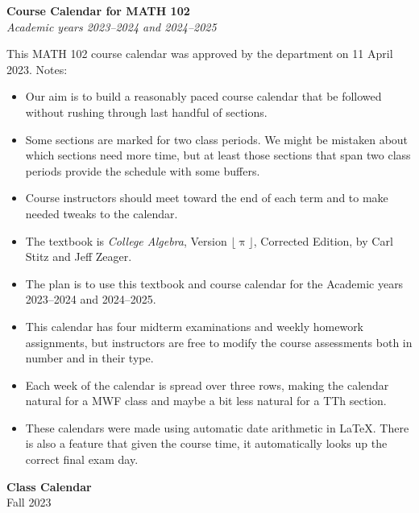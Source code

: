 \documentclass[11pt]{article} %
\newcounter{hw}\setcounter{hw}{0}
\newcounter{ex}\setcounter{ex}{0}
\newcounter{wk}\setcounter{wk}{0}
\newcommand{\calendarHead}[2]{%
  \setcounter{ex}{0}
  \setcounter{hw}{0}
  \setcounter{wk}{0}
  \large
   \begin{flushleft}
    \textbf{Class Calendar} \\
    #1 #2
  \end{flushleft}
  \normalsize}
\begin{document}
\begin{flushleft}
\large
\textbf{Course Calendar for MATH 102} \\
\normalsize
\emph{Academic years 2023--2024 and 2024--2025}
\end{flushleft}

\noindent This MATH 102 course calendar was approved by the department on 11 April 2023. 
Notes:

\begin{itemize}

\item Our aim is to build a reasonably paced course calendar that
be followed without rushing through last handful of
sections. 

\item Some sections are marked for two class periods. We might be
mistaken about which sections need more time, but at least those
sections that span two class periods provide the schedule with
some buffers. 

\item Course instructors should meet toward the end of each term 
and to make needed tweaks to the calendar.

\item The textbook is \emph{College Algebra}, Version $\lfloor \uppi \rfloor$,
Corrected Edition, by Carl Stitz and Jeff Zeager.

\item The plan is to use this textbook and course calendar for the Academic years 2023--2024 and 2024--2025.

\item This calendar has four midterm examinations and weekly homework 
 assignments, but instructors are free to modify the course 
 assessments both in number and in their type.

\item Each week of the calendar is spread over three rows, making the calendar natural
 for a MWF class and maybe a bit less natural for a TTh section.

\item These calendars were made using automatic date arithmetic in La\TeX.
There is also a feature that given the course time, it automatically
looks up the correct final exam day.

\end{itemize}
\vfill
\newpage
\SetDate[21/08/2023] 
\calendarHead{Fall}{2023}
\end{document}
